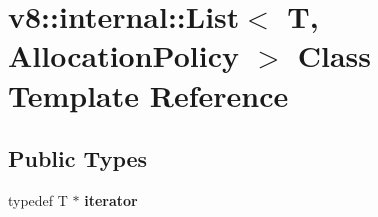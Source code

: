 \hypertarget{classv8_1_1internal_1_1_list}{}\section{v8\+:\+:internal\+:\+:List$<$ T, Allocation\+Policy $>$ Class Template Reference}
\label{classv8_1_1internal_1_1_list}
\subsection*{Public Types}
\begin{DoxyCompactItemize}
\item 
\hypertarget{classv8_1_1internal_1_1_list_a63875655519e6be0b2945aeddd1dc2be}{}typedef T $\ast$ {\bfseries iterator}\label{classv8_1_1internal_1_1_list_a63875655519e6be0b2945aeddd1dc2be}

\end{DoxyCompactItemize}

